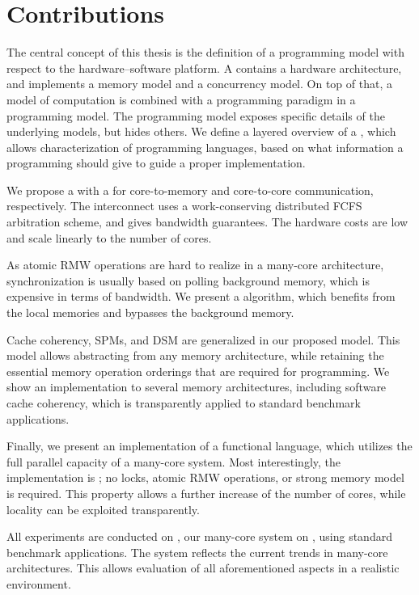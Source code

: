 \section{Contributions}

The central concept of this thesis is the definition of a programming model with respect to the hardware--software platform.
A  contains a hardware architecture, and implements a memory model and a concurrency model.
On top of that, a model of computation is combined with a programming paradigm in a programming model.
The programming model exposes specific details of the underlying models, but hides others.
We define a layered overview of a , which allows characterization of programming languages, based on what information a programming should give to guide a proper implementation.

We propose a  with a  for core-to-memory and core-to-core communication, respectively.
The interconnect uses a work-conserving distributed \acl{FCFS} arbitration scheme, and gives bandwidth guarantees.
The hardware costs are low and scale linearly to the number of cores.

As atomic \acl{RMW} operations are hard to realize in a many-core architecture, synchronization is usually based on polling background memory, which is expensive in terms of bandwidth.
We present a  algorithm, which benefits from the local memories and bypasses the background memory.

Cache coherency, \aclp{SPM}, and \acl{DSM} are generalized in our proposed  model.
This model allows abstracting from any memory architecture, while retaining the essential memory operation orderings that are required for programming.
We show an implementation to several memory architectures, including software cache coherency, which is transparently applied to standard benchmark applications.

Finally, we present an implementation of a functional language, which utilizes the full parallel capacity of a many-core system.
Most interestingly, the implementation is \emph{}; no locks, atomic \acl{RMW} operations, or strong memory model is required.
This property allows a further increase of the number of cores, while locality can be exploited transparently.

All experiments are conducted on \Starburst*, our many-core system on , using standard benchmark applications.
The system reflects the current trends in many-core architectures.
This allows evaluation of all aforementioned aspects in a realistic environment.


